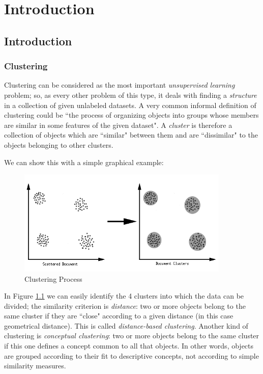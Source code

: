 \chapter{Introduction}\label{intro}

\section{Introduction}
\subsection{Clustering}
Clustering can be considered as the most important \textit{unsupervised learning} problem;
so, as every other problem of this type, it deals with finding a \textit{structure} in a
collection of given unlabeled datasets. A very common informal definition of clustering could be
``the process of organizing objects into groups whose members are similar in some features of the given dataset".
A \textit{cluster} is therefore a collection of objects which are ``similar" between them and are
``dissimilar" to the objects belonging to other clusters.

We can show this with a simple graphical example:

\begin{figure}[h]
  \centering
  \includegraphics[width=0.9\textwidth]{figures/clustering}
  \caption{Clustering Process}
  \label{fig:clustering}
\end{figure}

In Figure \ref{fig:clustering} we can easily identify the 4 clusters into which the data can be divided; the similarity
criterion is \textit{distance}: two or more objects belong to the same cluster if they are ``close" according to a
given distance (in this case geometrical distance). This is called \textit{distance-based clustering}.
Another kind of clustering is \textit{conceptual clustering}: two or more objects belong to the same cluster
if this one defines a concept common to all that objects. In other words, objects are grouped according
to their fit to descriptive concepts, not according to simple similarity measures.

